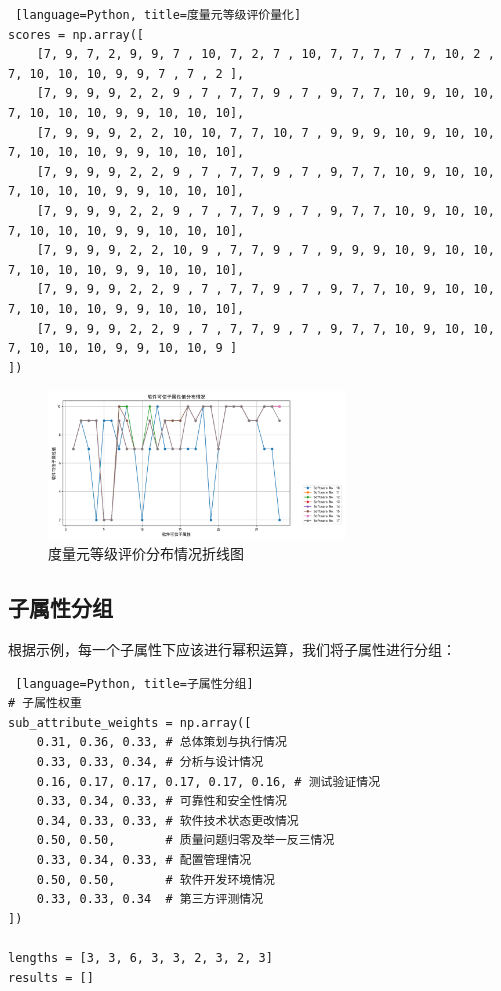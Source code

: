 \documentclass[14pt,a4paper,UTF8,twoside]{article}
\begin{document}
\begin{lstlisting} [language=Python, title=度量元等级评价量化]
scores = np.array([
    [7, 9, 7, 2, 9, 9, 7 , 10, 7, 2, 7 , 10, 7, 7, 7, 7 , 7, 10, 2 , 7, 10, 10, 10, 9, 9, 7 , 7 , 2 ],
    [7, 9, 9, 9, 2, 2, 9 , 7 , 7, 7, 9 , 7 , 9, 7, 7, 10, 9, 10, 10, 7, 10, 10, 10, 9, 9, 10, 10, 10],
    [7, 9, 9, 9, 2, 2, 10, 10, 7, 7, 10, 7 , 9, 9, 9, 10, 9, 10, 10, 7, 10, 10, 10, 9, 9, 10, 10, 10],
    [7, 9, 9, 9, 2, 2, 9 , 7 , 7, 7, 9 , 7 , 9, 7, 7, 10, 9, 10, 10, 7, 10, 10, 10, 9, 9, 10, 10, 10],
    [7, 9, 9, 9, 2, 2, 9 , 7 , 7, 7, 9 , 7 , 9, 7, 7, 10, 9, 10, 10, 7, 10, 10, 10, 9, 9, 10, 10, 10],
    [7, 9, 9, 9, 2, 2, 10, 9 , 7, 7, 9 , 7 , 9, 9, 9, 10, 9, 10, 10, 7, 10, 10, 10, 9, 9, 10, 10, 10],
    [7, 9, 9, 9, 2, 2, 9 , 7 , 7, 7, 9 , 7 , 9, 7, 7, 10, 9, 10, 10, 7, 10, 10, 10, 9, 9, 10, 10, 10],
    [7, 9, 9, 9, 2, 2, 9 , 7 , 7, 7, 9 , 7 , 9, 7, 7, 10, 9, 10, 10, 7, 10, 10, 10, 9, 9, 10, 10, 9 ]
])
\end{lstlisting}

\begin{figure}[H]
	\centering
	\includegraphics[width=0.7\textwidth]{img7/plt2.png}
	\caption{度量元等级评价分布情况折线图}	
\end{figure}


\subsection{子属性分组}

根据示例，每一个子属性下应该进行幂积运算，我们将子属性进行分组：

\begin{lstlisting} [language=Python, title=子属性分组]
# 子属性权重
sub_attribute_weights = np.array([
    0.31, 0.36, 0.33, # 总体策划与执行情况
    0.33, 0.33, 0.34, # 分析与设计情况
    0.16, 0.17, 0.17, 0.17, 0.17, 0.16, # 测试验证情况
    0.33, 0.34, 0.33, # 可靠性和安全性情况
    0.34, 0.33, 0.33, # 软件技术状态更改情况
    0.50, 0.50,       # 质量问题归零及举一反三情况
    0.33, 0.34, 0.33, # 配置管理情况
    0.50, 0.50,       # 软件开发环境情况
    0.33, 0.33, 0.34  # 第三方评测情况
])

lengths = [3, 3, 6, 3, 3, 2, 3, 2, 3]
results = []
\end{lstlisting}
\end{document}
